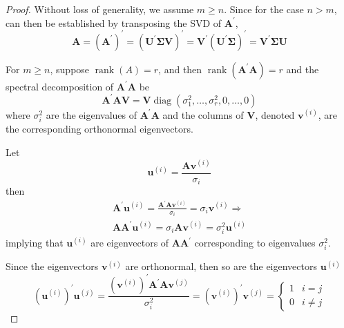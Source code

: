 \begin{proof}
	Without loss of generality, we assume $m\geq n$. Since for the case $n>m$, can then be established by transposing the SVD of $\mathbf{A}^{\prime}$,
	\begin{equation*}
		\mathbf{A}=\left(\mathbf{A}^{\prime}\right)^{\prime}=\left(\mathbf{U}^{\prime}\boldsymbol{\Sigma}\mathbf{V}\right)^{\prime}=\mathbf{V}^{\prime}\left(\mathbf{U}^{\prime}\boldsymbol{\Sigma}\right)^{\prime}=\mathbf{V}^{\prime}\boldsymbol{\Sigma}\mathbf{U}
	\end{equation*}

	For $m\geq n$, suppose $\operatorname{rank}(A)=r$, and then $\operatorname{rank}\left(\mathbf{A}^{\prime}\mathbf{A}\right)=r$ and the spectral decomposition of $\mathbf{A}^{\prime}\mathbf{A}$ be
	\begin{equation*}
		\mathbf{A}^{\prime}\mathbf{A}\mathbf{V}=\mathbf{V}\operatorname{diag}\left(\sigma_{1}^{2},\ldots,\sigma_{r}^{2},0,\ldots,0\right)
	\end{equation*}
	where $\sigma_{i}^{2}$ are the eigenvalues of $\mathbf{A}^{\prime}\mathbf{A}$ and the columns of $\mathbf{V}$, denoted $\boldsymbol{v}^{(i)}$, are the corresponding orthonormal eigenvectors.

	Let
	\begin{equation*}
		\boldsymbol{u}^{(i)}=\frac{\mathbf{A}\boldsymbol{v}^{(i)}}{\sigma_{i}}
	\end{equation*}
	then
	\begin{gather*}
		\mathbf{A}^{\prime}\boldsymbol{u}^{(i)}=\frac{\mathbf{A}^{\prime}\mathbf{A}\boldsymbol{v}^{(i)}}{\sigma_{i}}=\sigma_{i}\boldsymbol{v}^{(i)}\Rightarrow                       \\
		\mathbf{A}\mathbf{A}^{\prime}\boldsymbol{u}^{(i)}=\sigma_{i}\mathbf{A}\boldsymbol{v}^{(i)}=\sigma_{i}^{2}\boldsymbol{u}^{(i)}
	\end{gather*}
	implying that $\boldsymbol{u}^{(i)}$ are eigenvectors of $\mathbf{A}\mathbf{A}^{\prime}$ corresponding to eigenvalues $\sigma_{i}^{2}$.

	Since the eigenvectors $\boldsymbol{v}^{(i)}$ are orthonormal, then so are the eigenvectors $\boldsymbol{u}^{(i)}$
	\begin{equation*}
		\left(\boldsymbol{u}^{(i)}\right)^{\prime}\boldsymbol{u}^{(j)}=\frac{\left(\boldsymbol{v}^{(i)}\right)^{\prime}\mathbf{A}^{\prime}\mathbf{A}\boldsymbol{v}^{(j)}}{\sigma_{i}^{2}}=\left(\boldsymbol{v}^{(i)}\right)^{\prime}\boldsymbol{v}^{(j)}=\begin{cases}1 & i=j \\ 0 & i \neq j\end{cases}
	\end{equation*}


\end{proof}
